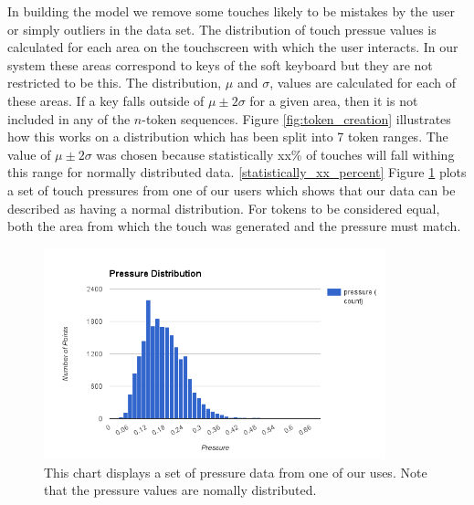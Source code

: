 \documentclass{acm_proc_article-sp}
\begin{document}
In building the model we remove some touches likely to be mistakes by the user or simply outliers in the data set.
The distribution of touch pressue values is calculated for each area on the touchscreen with which the user interacts. In our system these areas correspond to keys of the soft keyboard but they are not restricted to be this.
The distribution, $\mu$ and $\sigma$, values are calculated for each of these areas.
If a key falls outside of $\mu\pm2\sigma$ for a given area, then it is not included in any of the $n$-token sequences. 
Figure \ref{fig:token_creation} illustrates how this works on a distribution which has been split into 7 token ranges.
The value of $\mu\pm2\sigma$ was chosen because statistically xx\% of touches will fall withing this range for normally distributed data. \ref{statistically_xx_percent} Figure \ref{fig:normal_distribution} plots a set of touch pressures from one of our users which shows that our data can be described as having a normal distribution.
For tokens to be considered equal, both the area from which the touch was generated and the pressure must match.

\begin{figure}
\centering
\includegraphics[width=3.9in]{normal_distribution.png}
\caption{This chart displays a set of pressure data from one of our uses. Note that the pressure values are nomally distributed.}
\label{fig:normal_distribution}
\end{figure}

\end{document}
